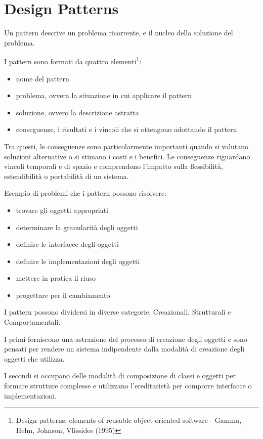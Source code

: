 \documentclass[a4paper,12pt,twoside]{book}
\begin{document}
\chapter{Design Patterns}

Un pattern descrive un problema ricorrente, e il nucleo della
soluzione del problema.

I pattern sono formati da quattro elementi\footnote{Design patterns:
  elements of reusable object-oriented software - Gamma,
  Helm, Johnson, Vlissides (1995)}:
\begin{itemize}
\item nome del pattern
\item problema, ovvera la situazione in cui applicare il pattern
\item soluzione, ovvero la descrizione astratta
\item conseguenze, i risultati e i vincoli che si ottengono adottando
  il pattern
\end{itemize}

Tra questi, le conseguenze sono particolarmente importanti quando si
valutano soluzioni alternative o si stimano i costi e i benefici. Le
conseguenze riguardano vincoli temporali e di spazio e comprendono
l'impatto sulla flessibilità, estendibilità o portabilità di un
sistema.

Esempio di problemi che i pattern possono risolvere:
\begin{itemize}
\item trovare gli oggetti appropriati
\item determinare la granularità degli oggetti
\item definire le interfacce degli oggetti
\item definire le implementazioni degli oggetti
\item mettere in pratica il riuso
\item progettare per il cambiamento
\end{itemize}

I pattern possono dividersi in diverse categorie: Creazionali,
Strutturali e Comportamentali.

I primi forniscono una astrazione del processo di creazione degli
oggetti e sono pensati per rendere un sistema indipendente dalla
modalità di creazione degli oggetti che utilizza.

I secondi si occupano delle modalità di composizione di classi e
oggetti per formare strutture complesse e utilizzano l'ereditarietà
per comporre interfacce o implementazioni.
\end{document}
